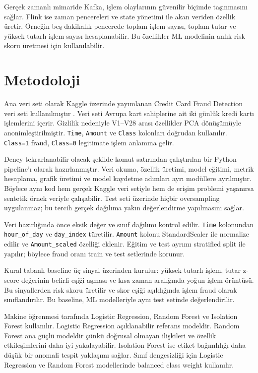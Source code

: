 \documentclass[conference]{IEEEtran}
\begin{document}
Gerçek zamanlı mimaride Kafka, işlem olaylarının güvenilir biçimde taşınmasını sağlar. Flink ise zaman pencereleri ve state yönetimi ile akan veriden özellik üretir. Örneğin beş dakikalık pencerede toplam işlem sayısı, toplam tutar ve yüksek tutarlı işlem sayısı hesaplanabilir. Bu özellikler ML modelinin anlık risk skoru üretmesi için kullanılabilir.

\section{Metodoloji}

Ana veri seti olarak Kaggle üzerinde yayımlanan Credit Card Fraud Detection veri seti kullanılmıştır \cite{dataset}. Veri seti Avrupa kart sahiplerine ait iki günlük kredi kartı işlemlerini içerir. Gizlilik nedeniyle V1--V28 arası özellikler PCA dönüşümüyle anonimleştirilmiştir. \texttt{Time}, \texttt{Amount} ve \texttt{Class} kolonları doğrudan kullanılır. \texttt{Class=1} fraud, \texttt{Class=0} legitimate işlem anlamına gelir.

Deney tekrarlanabilir olacak şekilde komut satırından çalıştırılan bir Python pipeline'ı olarak hazırlanmıştır. Veri okuma, özellik üretimi, model eğitimi, metrik hesaplama, grafik üretimi ve model kaydetme adımları ayrı modüllere ayrılmıştır. Böylece aynı kod hem gerçek Kaggle veri setiyle hem de erişim problemi yaşanırsa sentetik örnek veriyle çalışabilir. Test seti üzerinde hiçbir oversampling uygulanmaz; bu tercih gerçek dağılıma yakın değerlendirme yapılmasını sağlar.

Veri hazırlığında önce eksik değer ve sınıf dağılımı kontrol edilir. \texttt{Time} kolonundan \texttt{hour\_of\_day} ve \texttt{day\_index} türetilir. \texttt{Amount} kolonu StandardScaler ile normalize edilir ve \texttt{Amount\_scaled} özelliği eklenir. Eğitim ve test ayrımı stratified split ile yapılır; böylece fraud oranı train ve test setlerinde korunur.

Kural tabanlı baseline üç sinyal üzerinden kurulur: yüksek tutarlı işlem, tutar z-score değerinin belirli eşiği aşması ve kısa zaman aralığında yoğun işlem örüntüsü. Bu sinyallerden risk skoru üretilir ve skor eşiği aşıldığında işlem fraud olarak sınıflandırılır. Bu baseline, ML modelleriyle aynı test setinde değerlendirilir.

Makine öğrenmesi tarafında Logistic Regression, Random Forest ve Isolation Forest kullanılır. Logistic Regression açıklanabilir referans modeldir. Random Forest ana güçlü modeldir çünkü doğrusal olmayan ilişkileri ve özellik etkileşimlerini daha iyi yakalayabilir. Isolation Forest ise etiket bağımlılığı daha düşük bir anomali tespit yaklaşımı sağlar. Sınıf dengesizliği için Logistic Regression ve Random Forest modellerinde balanced class weight kullanılır.
\end{document}
